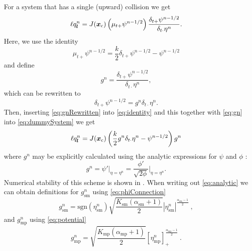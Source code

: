     For a system that has a single (upward) collision we get
    \begin{equation}\label{eq:dummySystem}
        \ell q^n_{\boldsymbol{l}} = J(\boldsymbol{x}_\text{c})\left(\mu_{t+}\psi^{n-1/2}\right)\frac{\delta_{t+}\psi^{n-1/2}}{\delta_{t\cdot}\eta^n}.
    \end{equation}
    Here, we use the identity 
    \begin{equation}\label{eq:identity}
        \mu_{t+}\psi^{n-1/2} = \frac{k}{2}\delta_{t+}\psi^{n-1/2}-\psi^{n-1/2}
    \end{equation}
    and define
    \begin{equation}\label{eq:gn}
        g^n = \frac{\delta_{t+}\psi^{n-1/2}}{\delta_{t\cdot}\eta^n},
    \end{equation}
    which can be rewritten to
    \begin{equation}\label{eq:gnRewritten}
        \delta_{t+}\psi^{n-1/2} = g^n\delta_{t\cdot}\eta^n.
    \end{equation}
    Then, inserting \eqref{eq:gnRewritten} into \eqref{eq:identity} and this together with \eqref{eq:gn} into \eqref{eq:dummySystem} we get
    \begin{equation}\label{eq:inserted}
        \ell q^n_{\boldsymbol{l}} = J(\boldsymbol{x}_\text{c})\left(\frac{k}{2}g^n\delta_{t\cdot}\eta^n-\psi^{n-1/2}\right)g^n
    \end{equation}
    where $g^n$ may be explicitly calculated using the analytic expressions for $\psi$ and $\phi$ \cite{Ducceschi2019}:
    \begin{equation}\label{eq:analytic}
        g^n = \psi'\bigg\rvert_{\eta=\eta^n} = \frac{\phi'}{\sqrt{2\phi}}\bigg\rvert_{\eta=\eta^n}.
    \end{equation}
    Numerical stability of this scheme is shown in \cite{Ducceschi2019}. When writing out \eqref{eq:analytic} we can obtain definitions for $g_\text{sm}^n$ using \eqref{eq:phiConnection}
    \begin{equation}\label{eq:gnSM}
        g_\text{sm}^n =\text{sgn}(\eta_\text{sm}^n)\sqrt{\frac{K_\text{sm}(\alpha_\text{sm}+1)}{2}}|\eta_\text{sm}^n|^{\frac{\alpha_\text{sm}-1}{2}}\ ,
    \end{equation}
    and $g_\text{mp}^n$ using \eqref{eq:potential}
    \begin{equation}\label{eq:gnMP}
        g_\text{mp}^n =\sqrt{\frac{K_\text{mp}(\alpha_\text{mp} + 1)}{2}} [\eta_\text{mp}^n]_+^{\frac{\alpha_\text{mp} - 1}{2}}\ .
    \end{equation} 
    
